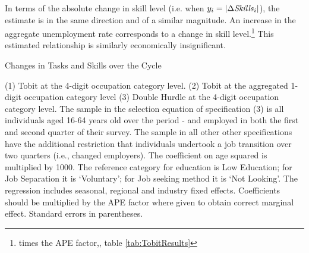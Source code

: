 \documentclass[preprint,12pt,authoryear]{elsarticle}
\begin{document}
In terms of the absolute change in skill level (i.e. when $y_i=|\Delta\text{\textit{Skills}}_{i}|$), the estimate is in the same direction and of a similar magnitude. An increase in the aggregate unemployment rate corresponds to a  change in skill level.\footnote{ times the APE factor,\hspace{-1mm}, table \ref{tab:TobitResults}} This estimated relationship is similarly economically insignificant.
\newpage
{}
\thispagestyle{empty}
\begin{table}[htbp]
	\centering
	\caption{Changes in Tasks and Skills over the Cycle}\label{tab:TobitResults}
	\begin{adjustbox}{width=\textwidth}
		\begin{threeparttable}
			
			
			\begin{tablenotes}
				\item{\footnotesize{(1) Tobit at the 4-digit occupation category level. (2) Tobit at the aggregated 1-digit occupation category level (3) Double Hurdle at the 4-digit occupation category level. The sample in the selection equation of specification (3) is all individuals aged 16-64 years old over the period \hspace{-1mm}-\hspace{-1mm} and employed in both the first and second quarter of their survey. The sample in all other other specifications have the additional restriction that individuals undertook a job transition over two quarters (i.e., changed employers). The coefficient on age squared is multiplied by 1000. The reference category for education is Low Education; for Job Separation it is `Voluntary';  for Job seeking method it is `Not Looking'. The regression includes seasonal, regional and industry fixed effects. Coefficients should be  multiplied by the APE factor where given to obtain correct marginal effect. Standard errors in parentheses.}}
			\end{tablenotes}
		\end{threeparttable}
	\end{adjustbox}
\end{table}
\restoregeometry %
\newpage
\end{document}
